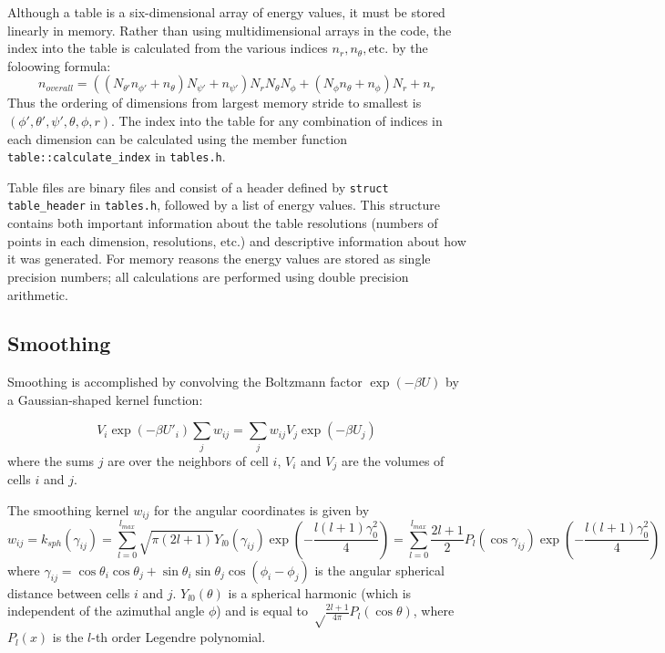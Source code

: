\documentclass{article}      %
\begin{document}
Although a table is a six-dimensional array of energy values, it must be stored linearly in memory.  Rather than using multidimensional arrays in the code, the index into the table is calculated from the various indices $n_r, n_\theta, $etc.  by the foloowing formula:
\begin{equation}
n_{overall} = ((N_{\theta'} n_{\phi'} + n_\theta) N_{\psi'} + n_{\psi'}) N_r N_\theta N_\phi + (N_\phi n_\theta + n_\phi) N_r + n_r
\end{equation}
Thus the ordering of dimensions from largest memory stride to smallest is $(\phi', \theta', \psi', \theta, \phi, r)$.    The index into the table for any combination of indices in each dimension can be calculated using the member function \verb+table::calculate_index+ in \verb+tables.h+.

Table files are binary files and consist of a header defined by \verb+struct table_header+ in \verb+tables.h+, followed by a list of energy values.   This structure contains both important information about the table resolutions (numbers of points in each dimension, resolutions, etc.) and descriptive information about how it was generated.   For memory reasons the energy values are stored as single precision numbers; all calculations are performed using double precision arithmetic.

\subsection{Smoothing}
Smoothing is accomplished by convolving the Boltzmann factor $\exp{(-\beta U)}$ by a Gaussian-shaped kernel function:
  
\begin{equation}
V_i \exp(-\beta U'_i) \sum_{j} w_{ij} = \sum_{j} w_{ij} V_j \exp(-\beta U_j)
\end{equation}
where the sums $j$ are over the neighbors of cell $i$, $V_i$ and $V_j$ are the volumes of cells $i$ and $j$. 

The smoothing kernel $w_{ij}$ for the angular coordinates is given by
\begin{equation}
w_{ij} = k_{sph}(\gamma_{ij}) =  \sum_{l=0}^{l_{max}} \sqrt{\pi(2l+1)}Y_{l0}(\gamma_{ij}) \exp\left(-\frac{l(l+1)\gamma_0^2}{4}\right) = \sum_{l=0}^{l_{max}} \frac{2l+1}{2} P_l(\cos \gamma_{ij})\exp \left(-\frac{l(l+1)\gamma_0^2}{4}\right)
\end{equation}
where $\gamma_{ij} = \cos \theta_i \cos \theta_j + \sin \theta_i \sin \theta_j \cos(\phi_i-\phi_j)$ is the angular spherical distance between cells $i$ and $j$. $Y_{l0}(\theta)$ is a spherical harmonic (which is independent of the azimuthal angle $\phi$) and is equal to $\sqrt\frac{2l+1}{4\pi} P_l(\cos \theta)$, where $P_l(x)$ is the $l$-th order Legendre polynomial.
\end{document}

